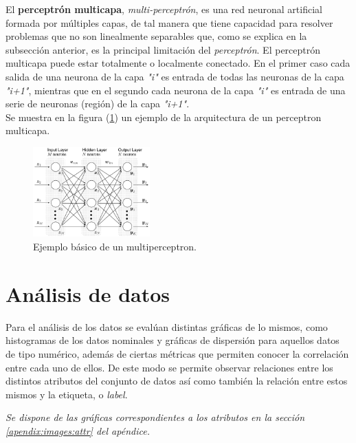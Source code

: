 \documentclass[osajnl,twocolumn,showpacs,superscriptaddress,10pt,floatfix]{revtex4-1} %
\begin{document}
El \textbf{perceptrón multicapa}, \textit{multi-perceptrón}, es una red neuronal artificial formada por múltiples capas, de tal manera que tiene capacidad para resolver problemas que no son linealmente separables que, como se explica en la subsección anterior, es la principal limitación del \textit{perceptrón}. El perceptrón multicapa puede estar totalmente o localmente conectado. En el primer caso cada salida de una neurona de la capa \textit{"i"} es entrada de todas las neuronas de la capa \textit{"i+1"}, mientras que en el segundo cada neurona de la capa \textit{"i"} es entrada de una serie de neuronas (región) de la capa \textit{"i+1"}. \\

Se muestra en la figura (\ref{figure:multiperceptron_example}) un ejemplo de la arquitectura de un perceptron multicapa.

\begin{figure}[H]
    \centering
    \includegraphics[width=0.4\textwidth]{theory/multiperceptron}
    \caption{Ejemplo básico de un multiperceptron.}
    \label{figure:multiperceptron_example}
\end{figure}

\section{Análisis de datos}

Para el análisis de los datos se evalúan distintas gráficas de lo mismos, como histogramas de los datos nominales y gráficas de dispersión para aquellos datos de tipo numérico, además de ciertas métricas que permiten conocer la correlación entre cada uno de ellos. De este modo se permite observar relaciones entre los distintos atributos del conjunto de datos así como también la relación entre estos mismos y la etiqueta, o \textit{label}.

\begin{flushright}
\textit{\footnotesize Se dispone de las gráficas correspondientes a los atributos en la sección \ref{apendix:images:attr} del apéndice.}
\end{flushright}
\end{document}
